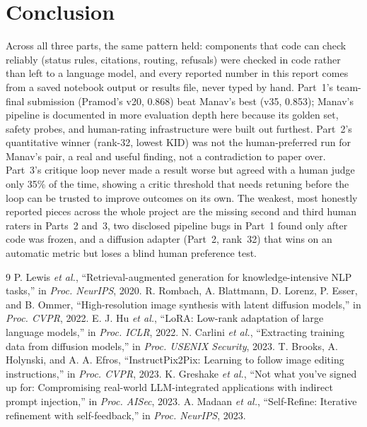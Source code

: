 \documentclass[conference,10pt]{IEEEtran}
\begin{document}
\section{Conclusion}

Across all three parts, the same pattern held: components that code can check reliably (status rules,
citations, routing, refusals) were checked in code rather than left to a language model, and every
reported number in this report comes from a saved notebook output or results file, never typed by
hand. Part~1's team-final submission (Pramod's v20, 0.868) beat Manav's best (v35, 0.853); Manav's
pipeline is documented in more evaluation depth here because its golden set, safety probes, and
human-rating infrastructure were built out furthest. Part~2's quantitative winner (rank-32, lowest
KID) was not the human-preferred run for Manav's pair, a real and useful finding, not a contradiction
to paper over. Part~3's critique loop never made a result worse but agreed with a human judge only
35\% of the time, showing a critic threshold that needs retuning before the loop can be trusted to
improve outcomes on its own. The weakest, most honestly reported pieces across the whole project are
the missing second and third human raters in Parts~2 and~3, two disclosed pipeline bugs in Part~1
found only after code was frozen, and a diffusion adapter (Part~2, rank~32) that wins on an automatic
metric but loses a blind human preference test.


\begin{thebibliography}{9}
 P. Lewis \textit{et al.}, ``Retrieval-augmented generation for knowledge-intensive
NLP tasks,'' in \textit{Proc. NeurIPS}, 2020.
 R. Rombach, A. Blattmann, D. Lorenz, P. Esser, and B. Ommer, ``High-resolution
image synthesis with latent diffusion models,'' in \textit{Proc. CVPR}, 2022.
 E. J. Hu \textit{et al.}, ``LoRA: Low-rank adaptation of large language models,'' in
\textit{Proc. ICLR}, 2022.
 N. Carlini \textit{et al.}, ``Extracting training data from diffusion models,''
in \textit{Proc. USENIX Security}, 2023.
 T. Brooks, A. Holynski, and A. A. Efros, ``InstructPix2Pix: Learning to follow
image editing instructions,'' in \textit{Proc. CVPR}, 2023.
 K. Greshake \textit{et al.}, ``Not what you've signed up for: Compromising
real-world LLM-integrated applications with indirect prompt injection,'' in \textit{Proc. AISec},
2023.
 A. Madaan \textit{et al.}, ``Self-Refine: Iterative refinement with
self-feedback,'' in \textit{Proc. NeurIPS}, 2023.
\end{thebibliography}
\end{document}
